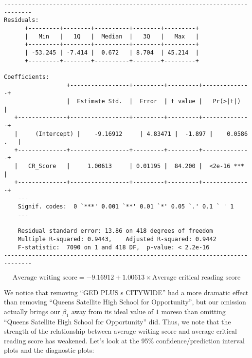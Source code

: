\documentclass[11pt]{article} %
\begin{document}
\begin{verbatim}
------------------------------------------------------------------------------
Residuals:
	  +---------+--------+----------+--------+---------+  
	  |   Min   |   1Q   |  Median  |   3Q   |   Max   |
	  +---------+--------+----------+--------+---------+  
	  | -53.245 | -7.414 |  0.672   | 8.704  | 45.214  |
	  +---------+--------+----------+--------+---------+ 
	
Coefficients:
                  +-----------------+---------+---------+--------------+
                  |  Estimate Std.  |  Error  | t value |   Pr(>|t|)   |
   +--------------+-----------------+---------+---------+--------------+
   |	 (Intercept) |    -9.16912     | 4.83471 |  -1.897 |    0.0586 .   |
   +--------------+-----------------+---------+---------+--------------+
   |   CR_Score   |     1.00613     | 0.01195 |  84.200 |  <2e-16 ***  |
   +--------------+-----------------+---------+---------+--------------+
    ---
    Signif. codes:  0 `***' 0.001 `**' 0.01 `*' 0.05 `.' 0.1 ` ' 1
    ---
	
    Residual standard error: 13.86 on 418 degrees of freedom
    Multiple R-squared: 0.9443,    Adjusted R-squared: 0.9442 
    F-statistic:  7090 on 1 and 418 DF,  p-value: < 2.2e-16
------------------------------------------------------------------------------
\end{verbatim}
\[ \text{Average writing score} = -9.16912 + 1.00613 \times \text{Average critical reading score}\]

We notice that removing ``GED PLUS s CITYWIDE'' had a more dramatic effect than removing ``Queens Satellite High School for Opportunity'', but our omission actually brings our $\beta_1$ away from its ideal value of $1$ moreso than omitting ``Queens Satellite High School for Opportunity'' did. Thus, we note that the strength of the relationship between average writing score and average critical reading score has weakened. Let's look at the 95\% confidence/prediction interval plots and the diagnostic plots:


\end{document}
